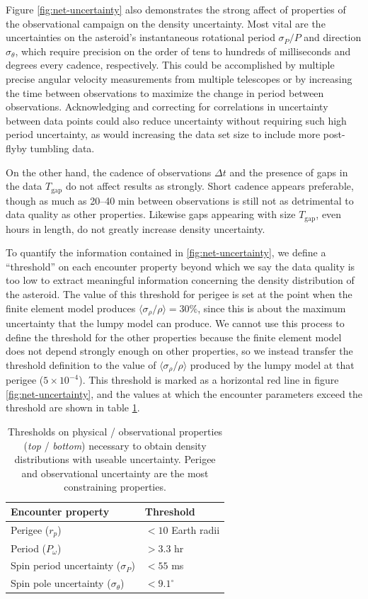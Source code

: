 \documentclass[fleqn,usenatbib]{mnras}
\begin{document}
Figure \ref{fig:net-uncertainty} also demonstrates the strong affect of properties of the observational campaign on the density uncertainty. Most vital are the uncertainties on the asteroid's instantaneous rotational period $\sigma_P / P$ and direction $\sigma_\theta$, which require precision on the order of tens to hundreds of milliseconds and degrees every cadence, respectively. This could be accomplished by multiple precise angular velocity measurements from multiple telescopes or by increasing the time between observations to maximize the change in period between observations. Acknowledging and correcting for correlations in uncertainty between data points could also reduce uncertainty without requiring such high period uncertainty, as would increasing the data set size to include more post-flyby tumbling data.

On the other hand, the cadence of observations $\Delta t$ and the presence of gaps in the data $T_\text{gap}$ do not affect results as strongly. Short cadence appears preferable, though as much as 20--40 min between observations is still not as detrimental to data quality as other properties. Likewise gaps appearing with size $T_\text{gap}$, even hours in length, do not greatly increase density uncertainty. 

To quantify the information contained in \ref{fig:net-uncertainty}, we define a ``threshold'' on each encounter property beyond which we say the data quality is too low to extract meaningful information concerning the density distribution of the asteroid. The value of this threshold for perigee is set at the point when the finite element model produces $\langle \sigma_\rho / \rho \rangle = 30\%$, since this is about the maximum uncertainty that the lumpy model can produce. We cannot use this process to define the threshold for the other properties because the finite element model does not depend strongly enough on other properties, so we instead transfer the threshold definition to the value of $\langle \sigma_\rho / \rho \rangle$ produced by the lumpy model at that perigee ($5\times 10^{-4}$). This threshold is marked as a horizontal red line in figure \ref{fig:net-uncertainty}, and the values at which the encounter parameters exceed the threshold are shown in table \ref{tab:threshold-summary}.

\begin{table}
  \centering
  \begin{tabular}{ll} \hline
    Encounter property & Threshold \\ \hline
    Perigee ($r_p$) & $<10$ Earth radii\\
    Period ($P_\omega$) & $>3.3$ hr \\ \hline
    Spin period uncertainty ($\sigma_P$) & $<55$ ms\\
    Spin pole uncertainty ($\sigma_\theta$) & $< 9.1^\circ$ \\
    \hline
  \end{tabular}
  \caption{Thresholds on physical / observational properties (\textit{top} / \textit{bottom}) necessary to obtain density distributions with useable uncertainty. Perigee and observational uncertainty are the most constraining properties.}
  \label{tab:threshold-summary}
\end{table}
\end{document}
